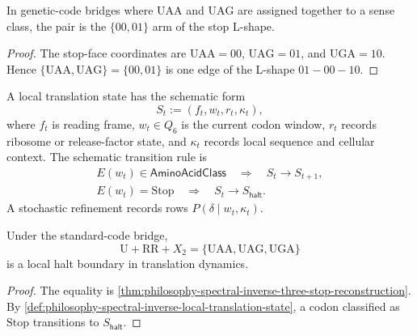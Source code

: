 \begin{proposition}
\label{prop:philosophy-inverse-stop-arm-reassignment}
In genetic-code bridges where $\mathrm{UAA}$ and $\mathrm{UAG}$ are
assigned together to a sense class, the pair is the $\{00,01\}$ arm of
the stop L-shape.
\end{proposition}
\begin{proof}
The stop-face coordinates are $\mathrm{UAA}=00$, $\mathrm{UAG}=01$, and
$\mathrm{UGA}=10$. Hence $\{\mathrm{UAA},\mathrm{UAG}\}=\{00,01\}$ is
one edge of the L-shape $01-00-10$.
\end{proof}

\begin{definition}
\label{def:philosophy-spectral-inverse-local-translation-state}
A local translation state has the schematic form
$$
  S_{t}:=(f_{t},w_{t},r_{t},\kappa_{t}),
$$
where $f_{t}$ is reading frame, $w_{t}\in Q_{6}$ is the current codon
window, $r_{t}$ records ribosome or release-factor state, and
$\kappa_{t}$ records local sequence and cellular context. The schematic
transition rule is
$$
\begin{gathered}
  E(w_{t})\in\mathsf{AminoAcidClass}
    \quad\Longrightarrow\quad S_{t}\to S_{t+1},\\
  E(w_{t})=\mathrm{Stop}
    \quad\Longrightarrow\quad S_{t}\to S_{\mathsf{halt}}.
\end{gathered}
$$
A stochastic refinement records rows $P(\delta\mid w_{t},\kappa_{t})$.
\end{definition}

\begin{theorem}
\label{thm:philosophy-spectral-inverse-stop-local-halt-boundary}
Under the standard-code bridge,
$$
  \mathrm{U}+\mathrm{RR}+X_{2}=
  \{\mathrm{UAA},\mathrm{UAG},\mathrm{UGA}\}
$$
is a local halt boundary in translation dynamics.
\end{theorem}
\begin{proof}
The equality is
\autoref{thm:philosophy-spectral-inverse-three-stop-reconstruction}. By
\autoref{def:philosophy-spectral-inverse-local-translation-state}, a
codon classified as $\mathrm{Stop}$ transitions to $S_{\mathsf{halt}}$.
\end{proof}

